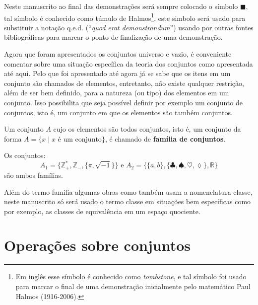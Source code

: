 \begin{note}
	Neste manuscrito ao final das demonstrações será sempre colocado o símbolo $\blacksquare$, tal símbolo é conhecido como túmulo de Halmos\footnote{Em inglês esse símbolo é conhecido como \textit{tombstone}, e tal símbolo foi usado para marcar o final de uma demonstração inicialmente pelo matemático Paul Halmos (1916-2006).}, este simbolo será usado para substituir a notação q.e.d. (``\textit{quod erat demonstrandum}'') usando por outras fontes bibliográficas para marcar o ponto de finalização de uma demonstração. 
\end{note}

Agora que foram apresentados os conjuntos universo e vazio, é conveniente comentar sobre uma situação específica da teoria dos conjuntos como apresentada até aqui. Pelo que foi apresentado até agora já se sabe que os itens em um conjunto são chamados de elementos, entretanto, não existe qualquer restrição, além de ser bem definido, para a natureza (ou tipo) dos elementos em um conjunto. Isso possibilita que seja possível definir por exemplo um conjunto de conjuntos, isto é, um conjunto em que os elementos são também conjuntos.

\begin{definition}[Família]\label{def:Familia}
	Um conjunto $A$ cujo os elementos são todos conjuntos, isto é, um conjunto da forma $A = \{x \mid x \mbox{ é um conjunto}\}$, é chamado de \textbf{família de conjuntos}.
\end{definition}

\begin{example}\label{exe:Familia}
	Os conjuntos: 
	$$A_1 = \{\mathbb{Z}^*_+, \mathbb{Z}_-, \{\pi, \sqrt{-1}\}\} \mbox{ e } A_2 = \{\{a, b\}, \{\clubsuit, \spadesuit, \heartsuit, \lozenge\}, \mathbb{R}\}$$
	são ambos famílias.
\end{example}

\begin{remark}
	Além do termo família algumas obras como \cite{lipschutz1978-TC} também usam a nomenclatura classe, neste manuscrito só será usado o termo classe em situações bem específicas como por exemplo, as classes de equivalência em um espaço quociente.
\end{remark}

\section{Operações sobre conjuntos}\label{sec:OperacoesConjuntos}

